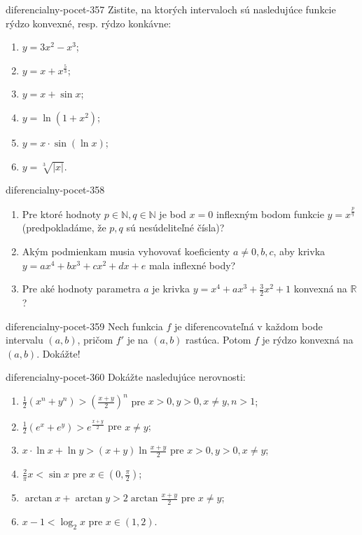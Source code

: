 \begin{defproblem}{diferencialny-pocet-357}
Zistite, na ktorých intervaloch sú nasledujúce funkcie rýdzo konvexné, resp. rýdzo konkávne:
\begin{multicols}{2}
\begin{enumerate}
    \item $y=3x^2-x^3$;
	\item $y=x+x^{\frac{5}{3}}$;
	\item $y=x+\sin x$;
	\item $y=\ln (1+x^2)$;
	\item $y=x\cdot\sin (\ln x)$;
	\item $y=\sqrt[3]{|x|}$.
\end{enumerate}
\end{multicols}
\end{defproblem}

\begin{defproblem}{diferencialny-pocet-358}
\begin{enumerate}
\item Pre ktoré hodnoty $p\in\mathbb{N},q\in\mathbb{N}$ je bod $x=0$ inflexným bodom funkcie $y=x^{\frac{p}{q}}$ (predpokladáme, že $p,q$ sú nesúdeliteľné čísla)?
\item Akým podmienkam musia vyhovovať koeficienty $a\neq 0,b,c$, aby krivka $y=ax^4+bx^3+cx^2+dx+e$ mala inflexné body?
\item Pre aké hodnoty parametra $a$ je krivka $y=x^4+ax^3+\frac{3}{2}x^2+1$ konvexná na $\mathbb{R}$?
\end{enumerate}
\end{defproblem}

\begin{defproblem}{diferencialny-pocet-359}
Nech funkcia $f$ je diferencovateľná v každom bode intervalu $(a,b)$, pričom $f'$ je na $(a,b)$ rastúca. Potom $f$ je rýdzo konvexná na $(a,b)$. Dokážte!
\end{defproblem}

\begin{defproblem}{diferencialny-pocet-360}
Dokážte nasledujúce nerovnosti:
\begin{enumerate}
\item $\frac{1}{2}(x^n+y^n)>(\frac{x+y}{2})^n$ pre $x>0,y>0,x\neq y,n>1$;
\item  $\frac{1}{2}(e^x+e^y)>e^{\frac{x+y}{2}}$ pre $x\neq y$;
\item $x\cdot\ln x+\ln y>(x+y)\ln \frac{x+y}{2}$ pre $x>0,y>0,x\neq y$;
\item $\frac{2}{\pi}x<\sin x$ pre $x\in (0,\frac{\pi}{2})$;
\item $\arctan x+\arctan y>2\arctan \frac{x+y}{2}$ pre $x\neq y$;
\item $x-1<\log_2 x$ pre $x\in (1,2)$.
\end{enumerate}
\end{defproblem}

